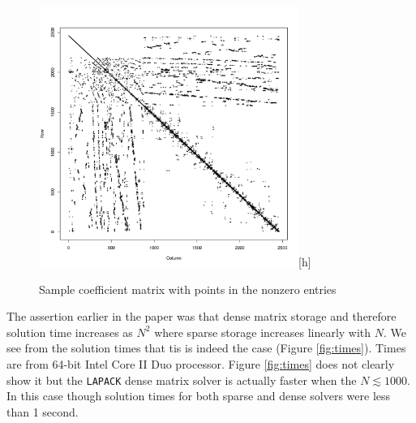 \documentclass[wrr]{agutex}  %
\begin{document}
\begin{article}
\begin{figure}
\noindent\includegraphics[width=20pc]{../plots/sparse_small.pdf}[h]
\caption{Sample coefficient matrix with points in the nonzero entries}\label{fig:sparseity}
\end{figure}

The assertion earlier in the paper was that dense matrix storage and therefore solution time increases as $N^2$ where sparse storage increases linearly with $N$.  We see from the solution times that tis is indeed the case (Figure \ref{fig:times}).  Times are from 64-bit Intel Core II Duo processor.  Figure \ref{fig:times} does not clearly show it but the {\tt  LAPACK} dense matrix solver is actually faster when the $N \lesssim 1000$.  In this case though solution times for both sparse and dense solvers were less than 1 second.


\end{article}
\end{document}
